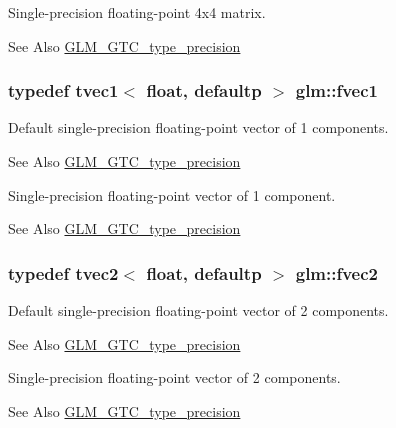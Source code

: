 Single-\/precision floating-\/point 4x4 matrix. \begin{DoxySeeAlso}{See Also}
\hyperlink{group__gtc__type__precision}{G\-L\-M\-\_\-\-G\-T\-C\-\_\-type\-\_\-precision} 
\end{DoxySeeAlso}
\hypertarget{group__gtc__type__precision_gaa732e5d06540922c44d3e35f32d6e948}{
\subsubsection[{fvec1}]{\setlength{\rightskip}{0pt plus 5cm}typedef tvec1$<$ float, defaultp $>$ {\bf glm\-::fvec1}}}\label{group__gtc__type__precision_gaa732e5d06540922c44d3e35f32d6e948}
Default single-\/precision floating-\/point vector of 1 components. \begin{DoxySeeAlso}{See Also}
\hyperlink{group__gtc__type__precision}{G\-L\-M\-\_\-\-G\-T\-C\-\_\-type\-\_\-precision}
\end{DoxySeeAlso}
Single-\/precision floating-\/point vector of 1 component. \begin{DoxySeeAlso}{See Also}
\hyperlink{group__gtc__type__precision}{G\-L\-M\-\_\-\-G\-T\-C\-\_\-type\-\_\-precision} 
\end{DoxySeeAlso}
\hypertarget{group__gtc__type__precision_ga83fb34639f810d0c9240cf7ff0180e20}{
\subsubsection[{fvec2}]{\setlength{\rightskip}{0pt plus 5cm}typedef tvec2$<$ float, defaultp $>$ {\bf glm\-::fvec2}}}\label{group__gtc__type__precision_ga83fb34639f810d0c9240cf7ff0180e20}
Default single-\/precision floating-\/point vector of 2 components. \begin{DoxySeeAlso}{See Also}
\hyperlink{group__gtc__type__precision}{G\-L\-M\-\_\-\-G\-T\-C\-\_\-type\-\_\-precision}
\end{DoxySeeAlso}
Single-\/precision floating-\/point vector of 2 components. \begin{DoxySeeAlso}{See Also}
\hyperlink{group__gtc__type__precision}{G\-L\-M\-\_\-\-G\-T\-C\-\_\-type\-\_\-precision} 
\end{DoxySeeAlso}
